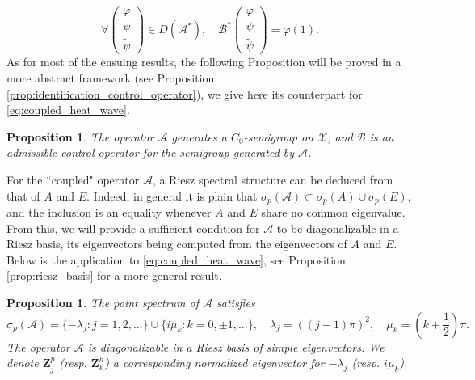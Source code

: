 \documentclass[10pt]{article}
\newtheorem{Proposition}[Theorem]{Proposition}
\begin{document}
\[
\forall \left( \begin{array}{c}
\varphi \\
\psi \\
\tilde{\psi}
\end{array} \right) \in D(\mathcal{A}^*),\quad 
\mathcal{B}^* \left( \begin{array}{c}
\varphi \\
\psi \\
\tilde{\psi}
\end{array} \right) = \varphi(1).
\] 
As for most of the ensuing results, the following Proposition will be proved in a more abstract framework (see Proposition \ref{prop:identification_control_operator}), we give here its counterpart for \eqref{eq:coupled_heat_wave}.
\begin{Proposition}\label{prop:wp}
The operator $\mathcal{A}$ generates a $C_0$-semigroup on $\mathcal{X}$, and $\mathcal{B}$ is an admissible control operator for the semigroup generated by $\mathcal{A}$. 
\end{Proposition}
For the ``coupled" operator $\mathcal{A}$, a Riesz spectral structure can be deduced from that of $A$ and $E$. Indeed, in general it is plain that $\sigma_p(\mathcal{A}) \subset \sigma_p(A) \cup \sigma_p(E)$, and the inclusion is an equality whenever $A$ and $E$ share no common eigenvalue. From this, we will provide a sufficient condition for $\mathcal{A}$ to be diagonalizable in a Riesz basis, its eigenvectors being computed from the eigenvectors of $A$ and $E$. Below is the application to \eqref{eq:coupled_heat_wave}, see Proposition \ref{prop:riesz_basis} for a more general result. 
\begin{Proposition}\label{prop:riesz_heat_wave}
The point spectrum of $\mathcal{A}$ satisfies 
\[
\sigma_p(\mathcal{A}) = \{ -\lambda_j : j=1,2,... \} \cup \{ i \mu_k : k = 0 , \pm 1 ,... \},\quad \lambda_j = ((j-1)\pi)^2,\quad \mu_k = \left(k + \frac{1}{2} \right)\pi.
\]
The operator $\mathcal{A}$ is diagonalizable in a Riesz basis of simple eigenvectors. We denote  $\mathbf{Z}_j^p$ (resp. $\mathbf{Z}_k^h$) a corresponding normalized eigenvector for $-\lambda_j$ (resp. $i\mu_k$). 
\end{Proposition}
\end{document}
